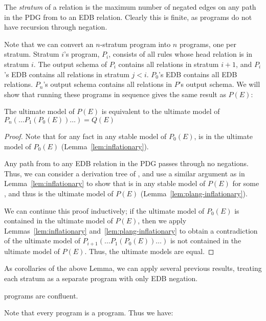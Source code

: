The {\em stratum} of a relation  is the maximum number of negated edges on any path in the PDG from  to an EDB relation.  Clearly this is finite, as \plang programs do not have recursion through negation.

Note that we can convert an $n$-stratum \plang program into $n$ \slang programs, one per stratum.  Stratum $i$'s program, $P_i$, consists of all rules whose head relation is in stratum $i$.  The output schema of $P_i$ contains all relations in stratum $i+1$, and $P_i$'s EDB contains all relations in stratum $j < i$.  $P_0$'s EDB contains all EDB relations.  $P_n$'s output schema contains all relations in $P$'s output schema.  We will show that running these programs in sequence gives the same result as $P(E)$:

\begin{lemma}
\label{lem:can-stratify}
The ultimate model of $P(E)$ is equivalent to the ultimate model of $P_n(\ldots P_1(P_0(E)) \ldots ) = Q(E)$
\end{lemma}
\begin{proof}
Note that for any fact  in any stable model of $P_0(E)$,  is in the ultimate model of $P_0(E)$ (Lemma~\ref{lem:inflationary}).

Any path from  to any EDB relation in the PDG passes through no negations.  Thus, we can consider a derivation tree of , and use a similar argument as in Lemma~\ref{lem:inflationary} to show that  is in any stable model of $P(E)$ for some , and thus is the ultimate model of $P(E)$ (Lemma~\ref{lem:plang-inflationary}).

We can continue this proof inductively; if the ultimate model of $P_0(E)$ is contained in the ultimate model of $P(E)$, then we apply Lemmas~\ref{lem:inflationary} and~\ref{lem:plang-inflationary} to obtain a contradiction of the ultimate model of $P_{i+1}(\ldots P_1(P_0(E)) \ldots)$ is not contained in the ultimate model of $P(E)$.  Thus, the ultimate models are equal.
\end{proof}

As corollaries of the above Lemma, we can apply several previous results, treating each stratum as a separate program with only EDB negation.

\begin{corollary}
\label{cor:plang-confluent}
\plang programs are confluent.
\end{corollary}

Note that every \slang program is a \plang program.  Thus we have:


